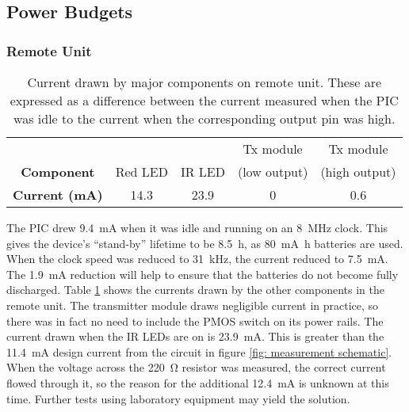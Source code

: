 \subsection{Power Budgets}\label{power budget}
\subsubsection{Remote Unit}

\begin{table}[htb]
	\begin{center}
	\caption{Current drawn by major components on remote unit. These are expressed as a difference between the current measured when the PIC was idle to the current when the corresponding output pin was high.}
	\label{tab: remote current}
	\begin{tabular}{|c|c|c|c|c|}
	\hline
	& & & Tx module & Tx module\\
	\textbf{Component} & Red LED & IR LED & (low output) & (high output)\\
	\hline
	\textbf{Current (mA)} & 14.3 & 23.9 & 0 & 0.6 \\
	\hline
	\end{tabular}
	\end{center}
\end{table}

The PIC drew \SI{9.4}{\milli\ampere} when it was idle and running on an \SI{8}{\mega\hertz} clock. This gives the device's ``stand-by'' lifetime to be \SI{8.5}{\hour}, as \SI{80}{\milli\ampere\hour} batteries are used. When the clock speed was reduced to \SI{31}{\kilo\hertz}, the current reduced to \SI{7.5}{\milli\ampere}. The \SI{1.9}{\milli\ampere} reduction will help to ensure that the batteries do not become fully discharged. Table \ref{tab: remote current} shows the currents drawn by the other components in the remote unit. The transmitter module draws negligible current in practice, so there was in fact no need to include the PMOS switch on its power rails. The current drawn when the IR LEDs are on is \SI{23.9}{\milli\ampere}. This is greater than the \SI{11.4}{\milli\ampere} design current from the circuit in figure \ref{fig: measurement schematic}. When the voltage across the \SI{220}{\ohm} resistor was measured, the correct current flowed through it, so the reason for the additional \SI{12.4}{\milli\ampere} is unknown at this time. Further tests using laboratory equipment may yield the solution.\\

